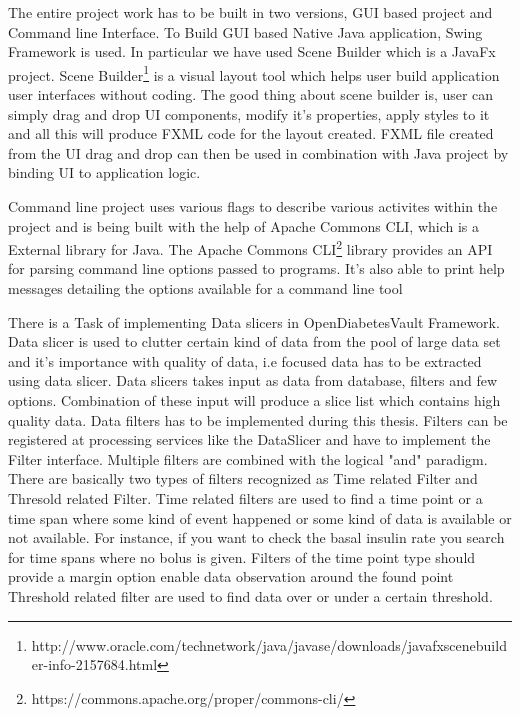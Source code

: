 \documentclass[article,type=msc,colorback,accentcolor=tud9c,twoside,11pt]{tudthesis}
\begin{document}
The entire project work has to be built in two versions, GUI based project and Command line Interface. To Build GUI based Native Java application, Swing Framework is used. In particular we have used Scene Builder which is a JavaFx\cite{JavaFx} project. Scene Builder\footnote{http://www.oracle.com/technetwork/java/javase/downloads/javafxscenebuilder-info-2157684.html} is a visual layout tool which helps user build application user interfaces without coding. The good thing about scene builder is, user can simply drag and drop UI components, modify it's properties, apply styles to it and all this will produce FXML code for the layout created. FXML file created from the UI drag and drop can then be used in combination with Java project by binding UI to application logic. 

Command line project uses various flags to describe various activites within the project and is being built with the help of Apache Commons CLI, which is a External library for Java. The Apache Commons CLI\footnote{https://commons.apache.org/proper/commons-cli/} library provides an API for parsing command line options passed to programs. It's also able to print help messages detailing the options available for a command line tool

There is a Task of implementing Data slicers in OpenDiabetesVault Framework. Data slicer is used to clutter certain kind of data from the pool of large data set and  it's importance with quality of data, i.e focused data has to be extracted using data slicer. Data slicers takes input as data from database, filters and few options. Combination of these input will produce a slice list which contains high quality data. Data filters has to be implemented during this thesis. Filters can be registered at processing services like the DataSlicer and have to implement the Filter interface. Multiple filters are combined with the logical "and" paradigm. There are basically two types of filters recognized as Time related Filter and Thresold related Filter. Time related filters  are used to find a time point or a time span where some kind of event happened or some kind of data is available or not available. For instance, if you want to check the basal insulin rate you search for time spans where no bolus is given. Filters of the time point type should provide a margin option enable data observation around the found point Threshold related filter are used to find data over or under a certain threshold. 
\end{document}

